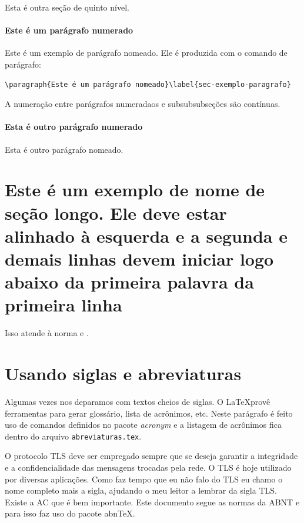 Esta é outra seção de quinto nível.


\paragraph{Este é um parágrafo numerado}\label{sec-exemplo-paragrafo}

Este é um exemplo de parágrafo nomeado. Ele é produzida com o comando de
parágrafo:

\begin{verbatim}
\paragraph{Este é um parágrafo nomeado}\label{sec-exemplo-paragrafo}
\end{verbatim}

A numeração entre parágrafos numeradaos e subsubsubseções são contínuas.

\paragraph{Esta é outro parágrafo numerado}\label{sec-exemplo-paragrafo-outro}

Esta é outro parágrafo nomeado.

\section{Este é um exemplo de nome de seção longo. Ele deve estar
alinhado à esquerda e a segunda e demais linhas devem iniciar logo abaixo da
primeira palavra da primeira linha}

Isso atende à norma  
 e .


\section{Usando siglas e abreviaturas}

Algumas vezes nos deparamos com textos cheios de siglas. O \LaTeX provê ferramentas para gerar glossário, lista de acrônimos, etc. Neste parágrafo é feito uso de comandos definidos no pacote \textit{acronym} e a listagem de acrônimos fica dentro do arquivo \texttt{abreviaturas.tex}.

O protocolo \ac{TLS} deve ser empregado sempre que se deseja garantir a integridade e a confidencialidade das mensagens trocadas pela rede. O \ac{TLS} é hoje utilizado por diversas aplicações. Como faz tempo que eu não falo do \acf{TLS} eu chamo o nome completo mais a sigla, ajudando o meu leitor a lembrar da sigla \ac{TLS}. Existe a \ac{AC} que é bem importante. Este documento segue as normas da \ac{ABNT} e para isso faz uso do pacote \ac{abnTeX}.

